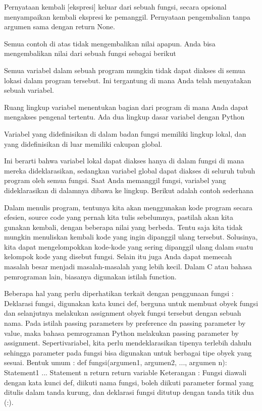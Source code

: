 Pernyataan kembali [ekspresi] keluar dari sebuah fungsi, secara opsional menyampaikan kembali ekspresi ke pemanggil. Pernyataan pengembalian tanpa argumen sama dengan return None. 

Semua contoh di atas tidak mengembalikan nilai apapun. Anda bisa mengembalikan nilai dari sebuah fungsi sebagai berikut

Semua variabel dalam sebuah program mungkin tidak dapat diakses di semua lokasi dalam program tersebut. Ini tergantung di mana Anda telah menyatakan sebuah variabel. 
 
Ruang lingkup variabel menentukan bagian dari program di mana Anda dapat mengakses pengenal tertentu. Ada dua lingkup dasar variabel dengan Python 

Variabel yang didefinisikan di dalam badan fungsi memiliki lingkup lokal, dan yang didefinisikan di luar memiliki cakupan global. 

Ini berarti bahwa variabel lokal dapat diakses hanya di dalam fungsi di mana mereka dideklarasikan, sedangkan variabel global dapat diakses di seluruh tubuh program oleh semua fungsi. Saat Anda memanggil fungsi, variabel yang dideklarasikan di dalamnya dibawa ke lingkup. Berikut adalah contoh sederhana 

Dalam   menulis   program, tentunya   kita   akan menggunakan kode program secara efesien, source code yang pernah kita tulis sebelumnya, pastilah akan kita  
gunakan  kembali,  dengan  beberapa  nilai  yang  berbeda. 
Tentu saja kita tidak mungkin menuliskan kembali  kode  yang  ingin  dipanggil  ulang  tersebut.  
Solusinya,  kita  dapat  mengelompokkan  kode-kode  yang sering dipanggil ulang dalam suatu kelompok kode yang disebut fungsi. 
Selain  itu  juga  Anda  dapat  memecah  masalah  besar  menjadi  masalah-masalah  yang  lebih  kecil.  Dalam  C  atau  bahasa  pemrograman  lain,  biasanya  digunakan istilah function. 

Beberapa hal yang perlu diperhatikan terkait dengan penggunaan fungsi :
Deklarasi fungsi, digunakan kata kunci def, berguna untuk membuat obyek fungsi dan selanjutnya melakukan assignment obyek fungsi tersebut dengan sebuah nama.
Pada istilah passing parameters by preference dn passing parameter by value, maka bahasa pemrograman Python melakukan passing parameter
by assignment.
Sepertivariabel, kita perlu mendeklarasikan tipenya terlebih dahulu sehingga parameter pada fungsi bisa digunakan untuk berbagai tipe obyek yang sesuai.
Bentuk umum :
def fungsi(argumen1, argumen2, ..., argumen n):
 Statement1
 ...
 Statement n
 return return variable
Keterangan : 
Fungsi diawali dengan kata kunci def, diikuti nama fungsi, boleh diikuti parameter formal yang ditulis dalam tanda kurung, dan deklarasi fungsi ditutup dengan tanda titik dua (:).
